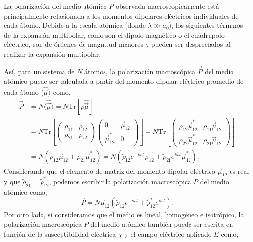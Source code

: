 La polarización del medio atómico $P$ observada macroscopicamente está principalmente relacionada a los momentos dipolares eléctricos individuales de cada átomo. Debido a la escala atómica (donde $\lambda \gg a_0$), los siguientes términos de la expansión multipolar, como son el  dipolo magnético o el cuadrupolo eléctrico, son de órdenes de magnitud menores y pueden ser despreciados al realizar la expansión multipolar. 

Así, para un sistema de $N$ átomos, la polarización macroscópica $\vec{P}$ del medio atómico puede ser calculada a partir del momento dipolar eléctrico promedio de cada átomo $\langle \hat{\vec{\mu}} \rangle$ como,
\begin{equation}
    \begin{split}
        \vec{P} &= N \langle \hat{\vec{\mu}} \rangle = N \text{Tr}[\rho \hat{\vec{\mu}}]\\
        &= N \text{Tr} \left[ \begin{pmatrix}
        \rho_{11} & \rho_{12} \\
        \rho_{21} & \rho_{22} 
        \end{pmatrix} \begin{pmatrix}
        0 & \vec{\mu}_{12} \\
        \vec{\mu}_{12}^* & 0
        \end{pmatrix} \right]
        =  N \text{Tr} \left[ \begin{pmatrix}
        \rho_{12}\vec{\mu}_{12}^* & \rho_{11}\vec{\mu}_{12} \\
        \rho_{22} \vec{\mu}_{12}^* & \rho_{21}\vec{\mu}_{12}
        \end{pmatrix} \right] \\
        &=  N (\rho_{12} \vec{\mu}_{12} + \rho_{21} \vec{\mu}_{12}^*)
        = N (\tilde{\rho}_{12}e^{-i \omega t} \vec{\mu}_{12} + \tilde{\rho}_{21}e^{i \omega t} \vec{\mu}_{12}^*).
    \end{split}
\end{equation}
Considerando que el elemento de matriz del momento dipolar eléctrico $\vec{\mu}_{12}$ es real y que $\tilde{\rho}_{21} = \tilde{\rho}_{12}^*$, podemos escribir la polarización macroscópica $P$ del medio atómico como,
\begin{equation}
\boxed{
    \vec{P} = N \vec{\mu}_{12} (\tilde{\rho}_{12}e^{-i \omega t}  + \tilde{\rho}_{12}^*e^{i \omega t}).
}
\end{equation}
Por otro lado, si consideramos que el medio es lineal, homogéneo e isotrópico, la polarización macroscópica $P$ del medio atómico también puede ser escrita en función de la susceptibilidad eléctrica $\chi$ y el campo eléctrico aplicado $E$ como,
